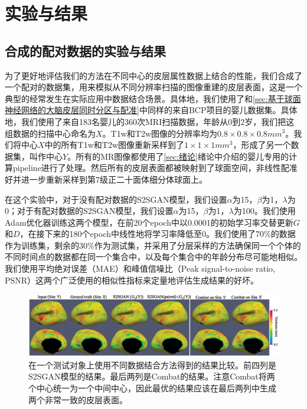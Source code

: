 	

\section{实验与结果}

\subsection{合成的配对数据的实验与结果}\label{sec:Synthetic}
为了更好地评估我们的方法在不同中心的皮层属性数据上结合的性能，我们合成了一个配对的数据集，用来模拟从不同分辨率扫描的图像重建的皮层表面，这是一个典型的经常发生在实际应用中数据结合场景。具体地，我们使用了和\ref{sec:基于球面神经网络的大脑皮层同时分区与配准}中同样的来自BCP项目\cite{howell2019unc}的婴儿数据集。具体地，我们使用了来自183名婴儿的360次MRI扫描数据，年龄从0到2岁，我们把这组数据的扫描中心命名为$X$。T1w和T2w图像的分辨率均为$0.8\times 0.8\times 0.8mm^3$。我们将中心$X$中的所有T1w和T2w图像重新采样到了$1\times 1\times 1mm^3$，形成了另一个数据集，叫作中心$Y$。所有的MR图像都使用了\ref{sec:绪论}绪论中介绍的婴儿专用的计算pipeline进行了处理。然后所有的皮层表面都被映射到了球面空间，非线性配准好并进一步重新采样到第7级正二十面体细分体球面上。

在这个实验中，对于没有配对数据的S2SGAN模型，我们设置$\alpha$为15，$\beta$为1，$\lambda$为0；对于有配对数据的S2SGAN模型，我们设置$\alpha$为15，$\beta$为1，$\lambda$为100。我们使用Adam优化器训练这两个模型，在前20个epoch中以0.0001的初始学习率交替更新$G$和$D$，在接下来的180个epoch中线性地将学习率降低至0。我们使用了70\%的数据作为训练集，剩余的30\%作为测试集，并采用了分层采样的方法确保同一个个体的不同时间点的数据都在同一个集合中，以及每个集合中的年龄分布尽可能地相似。我们使用平均绝对误差（MAE）和峰值信噪比（Peak signal-to-noise ratio, PSNR）这两个广泛使用的相似性指标来定量地评估生成结果的好坏。

\begin{figure}[h]
	\centering
	\includegraphics[width=\linewidth]{figure/s2sgan_paired_result.eps}
	\caption{在一个测试对象上使用不同数据结合方法得到的结果比较。前四列是S2SGAN模型的结果。最后两列是Combat的结果。注意Combat将两个中心统一为一个中间中心，因此最优的结果应该在最后两列中生成两个非常一致的皮层表面。}\label{fig:s2sgan_paired_result} 
\end{figure} 

